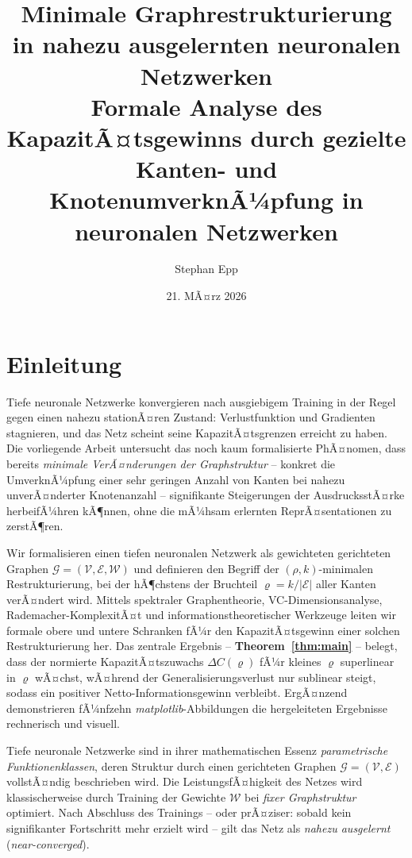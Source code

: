 ﻿\documentclass[12pt, a4paper, openany]{report}
\title{%
  \textbf{Minimale Graphrestrukturierung in nahezu ausgelernten neuronalen Netzwerken}\\
  \Large Formale Analyse des KapazitÃ¤tsgewinns durch gezielte\\
  Kanten- und KnotenumverknÃ¼pfung in neuronalen Netzwerken
}
\author{Stephan Epp}
\date{21. MÃ¤rz 2026}
\newcommand{\calG}{\mathcal{G}}
\newcommand{\calV}{\mathcal{V}}
\newcommand{\calE}{\mathcal{E}}
\newcommand{\calW}{\mathcal{W}}
\begin{document}
\maketitle
\tableofcontents
\newpage

\chapter{Einleitung}
\label{sec:intro}
Tiefe neuronale Netzwerke konvergieren nach ausgiebigem Training in der Regel
gegen einen nahezu stationÃ¤ren Zustand: Verlustfunktion und Gradienten
stagnieren, und das Netz scheint seine KapazitÃ¤tsgrenzen erreicht zu haben.
Die vorliegende Arbeit untersucht das noch kaum formalisierte PhÃ¤nomen, dass
bereits \emph{minimale VerÃ¤nderungen der Graphstruktur} -- konkret die
UmverknÃ¼pfung einer sehr geringen Anzahl von Kanten bei nahezu unverÃ¤nderter
Knotenanzahl -- signifikante Steigerungen der AusdrucksstÃ¤rke herbeifÃ¼hren
kÃ¶nnen, ohne die mÃ¼hsam erlernten ReprÃ¤sentationen zu zerstÃ¶ren.

Wir formalisieren einen tiefen neuronalen Netzwerk als gewichteten gerichteten
Graphen $\calG = (\calV, \calE, \calW)$ und definieren den Begriff der
$(\rho, k)$-minimalen Restrukturierung, bei der hÃ¶chstens der Bruchteil
$\varrho = k/|\calE|$ aller Kanten verÃ¤ndert wird.  Mittels spektraler
Graphentheorie, VC-Dimensionsanalyse, Rademacher-KomplexitÃ¤t und
informationstheoretischer Werkzeuge leiten wir formale obere und untere
Schranken fÃ¼r den KapazitÃ¤tsgewinn einer solchen Restrukturierung her.  Das
zentrale Ergebnis -- \textbf{Theorem~\ref{thm:main}} -- belegt, dass der
normierte KapazitÃ¤tszuwachs $\Delta C(\varrho)$ fÃ¼r kleines $\varrho$
superlinear in $\varrho$ wÃ¤chst, wÃ¤hrend der Generalisierungsverlust nur
sublinear steigt, sodass ein positiver Netto-Informationsgewinn verbleibt.
ErgÃ¤nzend demonstrieren fÃ¼nfzehn \textit{matplotlib}-Abbildungen die
hergeleiteten Ergebnisse rechnerisch und visuell.

Tiefe neuronale Netzwerke sind in ihrer mathematischen Essenz \emph{parametrische
Funktionenklassen}, deren Struktur durch einen gerichteten Graphen
$\calG = (\calV, \calE)$ vollstÃ¤ndig beschrieben wird.  Die LeistungsfÃ¤higkeit
des Netzes wird klassischerweise durch Training der Gewichte $\calW$ bei
\emph{fixer Graphstruktur} optimiert.  Nach Abschluss des Trainings -- oder
prÃ¤ziser: sobald kein signifikanter Fortschritt mehr erzielt wird -- gilt das
Netz als \emph{nahezu ausgelernt} (\textit{near-converged}).
\end{document}
